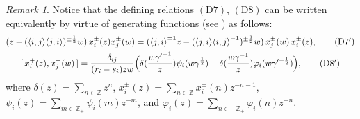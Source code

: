 \documentclass{amsproc}
\theoremstyle{remark}
\newtheorem{remark}[theo]{Remark}
\numberwithin{equation}{section}
\begin{document}
\begin{remark}  Notice that the defining relations
$(\textrm{D7})$, $(\textrm{D8})$ can be written equivalently by
virtue of generating functions (see \cite{HZ}) as follows:
\begin{gather*}
(z-({\langle} i,j{\rangle}{\langle} j,i{\rangle})^{\pm\frac1{2}}w)\,x_i^{\pm}(z)x_j^{\pm}(w)
=({\langle} j,i{\rangle}^{\pm1}z-({\langle} j,i{\rangle}{\langle}
i,j{\rangle}^{-1})^{\pm\frac1{2}}w)\,x_j^{\pm}(w)\,x_i^{\pm}(z),\tag{\textrm{D7}$'$}\\
[\,x_i^+(z),
x_j^-(w)\,]=\frac{\delta_{ij}}{(r_i-s_i)zw}\Big(\delta(\frac{w{\gamma'}^{-1}}{z})
\psi_i(w\gamma^{\frac{1}2})
-\delta(\frac{w\gamma^{-1}}{z})\varphi_i(w\gamma'^{-\frac1{2}})\Big),\tag{\textrm{D8}$'$}
\end{gather*}
where $\delta(z)=\sum_{n\in\mathbb{Z}}z^n$,
$x_i^{\pm}(z)=\sum\limits_{n\in\mathbb{Z}}x_i^{\pm}(n)z^{-n-1}$,
$\psi_i(z) = \sum_{m \in \mathbb{Z}_+}\psi_i(m) z^{-m}$, and
$\varphi_i(z) = \sum_{n \in -\mathbb{Z}_+}\varphi_i(n) z^{-n}$.
\end{remark}
\end{document}
